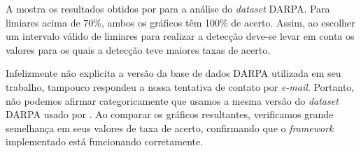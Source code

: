 A  mostra os resultados obtidos por \cite{HOQUE201748} para a análise do \textit{dataset} DARPA. Para limiares acima de 70\%, ambos os gráficos têm 100\% de acerto. Assim, ao escolher um intervalo válido de limiares para realizar a detecção deve-se levar em conta os valores para os quais a detecção teve maiores taxas de acerto.

Infelizmente \cite{HOQUE201748} não explicita a versão da base de dados DARPA utilizada em seu trabalho, tampouco respondeu a nossa tentativa de contato por \textit{e-mail}. Portanto, não podemos afirmar categoricamente que usamos a mesma versão do \textit{dataset} DARPA usado por . Ao comparar os gráficos resultantes, verificamos grande semelhança em seus valores de taxa de acerto, confirmando que o \textit{framework} implementado está funcionando corretamente.  